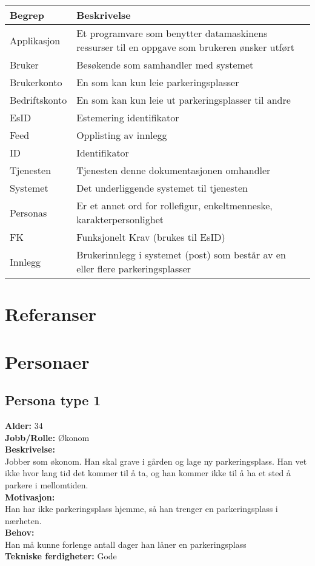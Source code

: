 \documentclass[12pt]{article}
\begin{document}
\begin{center}
    \begin{tabular}{|p{4cm}|p{12cm}| } 
        \hline
        \bf Begrep & \bf Beskrivelse \\
        \hline
        Applikasjon &  Et programvare som benytter datamaskinens ressurser til en oppgave som brukeren ønsker utført \\
        \hline
        Bruker & Besøkende som samhandler med systemet \\
        \hline
        Brukerkonto & En som kan kun leie parkeringsplasser \\
        \hline
        Bedriftskonto & En som kan kun leie ut parkeringsplasser til andre \\
        \hline
        EsID & Estemering identifikator \\
        \hline
        Feed & Opplisting av innlegg \\
        \hline
        ID & Identifikator \\
        \hline
        Tjenesten & Tjenesten denne dokumentasjonen omhandler \\
        \hline
        Systemet & Det underliggende systemet til tjenesten \\
        \hline
        Personas & Er et annet ord for rollefigur, enkeltmenneske, karakterpersonlighet\\
        \hline
        FK & Funksjonelt Krav (brukes til EsID)\\
        \hline
        Innlegg & Brukerinnlegg i systemet (post) som består av en eller flere parkeringsplasser\\
        \hline
    \end{tabular}
\end{center}

\section{Referanser}

\section{Personaer}

    \subsection{Persona type 1}
    \textbf{Alder:} 34 \\\textbf{Jobb/Rolle:} Økonom\\\textbf{Beskrivelse:}\\Jobber som økonom. Han skal grave i gården og lage ny parkeringsplass. Han vet ikke hvor lang tid det kommer til å ta, og han kommer ikke til å ha et sted å parkere i mellomtiden.\\\textbf{Motivasjon:}\\Han har ikke parkeringsplass hjemme, så han trenger en parkeringsplass i nærheten.\\\textbf{Behov:}\\Han må kunne forlenge antall dager han låner en parkeringsplass\\\textbf{Tekniske ferdigheter:} Gode
\end{document}
